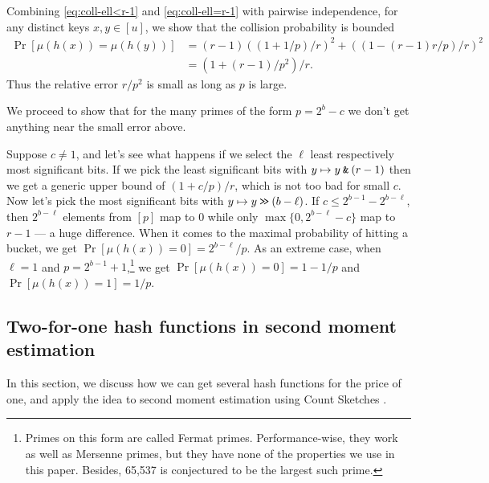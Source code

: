 Combining \eqref{eq:coll-ell<r-1} and \eqref{eq:coll-ell=r-1} with
pairwise independence, for any distinct keys $x,y\in [u]$, we show that the
collision probability is bounded
\begin{align}
	\Pr[\mu(h(x))=\mu(h(y))]
	 & =(r-1)((1+1/p)/r)^2+((1-(r-1)r/p)/r)^2 \nonumber
	\\&=(1+(r-1)/p^2)/r
	.\label{eq:coll}
\end{align}
Thus the relative error $r/p^2$ is small as long as $p$ is large.

\vspace{.5em}

We proceed to show that for the many primes of the form $p=2^b-c$ we don't get anything near the small error above.




Suppose $c\neq 1$, and let's see what happens if we select
the $\ell$ least respectively most significant bits. If
we pick the least significant bits with $y\mapsto y\mathbin{\texttt{\&}}(r-1)$
then we get a generic upper bound of $(1+c/p)/r$, which is not
too bad for small $c$.
Now let's pick the most significant bits with $y\mapsto y\mathbin{\texttt{>\!>}} (b-\ell)$.
If $c\leq 2^{b-1}-2^{b-\ell}$, then $2^{b-\ell}$ elements from
$[p]$ map to $0$ while only $\max\{0,2^{b-\ell}-c\}$
map to $r-1$ --- a huge difference.
When it comes to the maximal probability of hitting a bucket,
we get $\Pr[\mu(h(x))=0]=2^{b-\ell}/p$.
As an extreme case, when $\ell=1$ and $p=2^{b-1}+1$,\footnote{Primes on this form are called Fermat primes.
	Performance-wise, they work as well as Mersenne primes, but they have none of the properties we use in this paper.
	Besides, 65,537 is conjectured to be the largest such prime.}
we get $\Pr[\mu(h(x))=0]=1-1/p$ and $\Pr[\mu(h(x))=1]=1/p$.

\subsection{Two-for-one hash functions in second moment estimation}
In this section, we discuss how we can get several hash functions for
the price of one, and apply the idea to second moment estimation using
Count Sketches \cite{charikar04count-sketch}.

